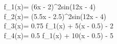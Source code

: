 f_1(x)= (6x - 2)^{2}sin(12x - 4) \\
f_2(x)= (5.5x - 2.5)^{2}sin(12x - 4) \\
f_3(x)= 0.75 \cdot f_{1}(x) + 5(x - 0.5) - 2 \\
f_4(x)= 0.5 \cdot f_{1}(x) + 10(x - 0.5) - 5 \\
